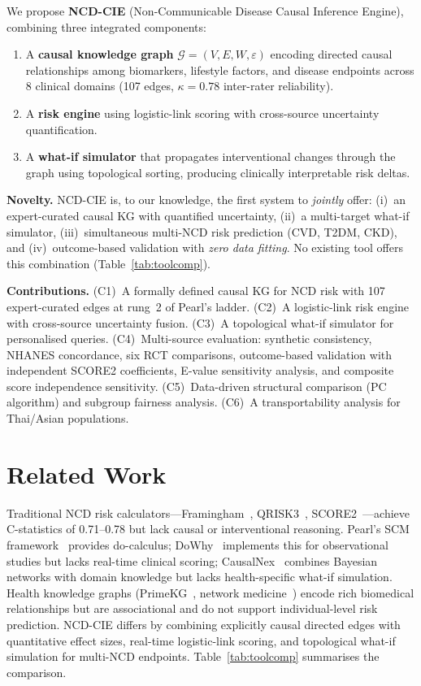 \documentclass[runningheads]{llncs}
\begin{document}
We propose \textbf{NCD-CIE} (Non-Communicable Disease Causal Inference
Engine), combining three integrated components:
\begin{enumerate}
\item A \textbf{causal knowledge graph} $\mathcal{G}=(V,E,W,\varepsilon)$
  encoding directed causal relationships among biomarkers, lifestyle
  factors, and disease endpoints across 8 clinical domains
  (107 edges, $\kappa=0.78$ inter-rater reliability).
\item A \textbf{risk engine} using logistic-link scoring with
  cross-source uncertainty quantification.
\item A \textbf{what-if simulator} that propagates
  interventional changes through the graph using topological sorting,
  producing clinically interpretable risk deltas.
\end{enumerate}

\noindent\textbf{Novelty.}
NCD-CIE is, to our knowledge, the first system to \emph{jointly}
offer: (i)~an expert-curated causal KG with quantified uncertainty,
(ii)~a multi-target what-if simulator,
(iii)~simultaneous multi-NCD risk prediction (CVD, T2DM, CKD), and
(iv)~outcome-based validation with \emph{zero data fitting}.
No existing tool offers this combination (Table~\ref{tab:toolcomp}).

\noindent\textbf{Contributions.}
(C1)~A formally defined causal KG for NCD risk with 107
expert-curated edges at rung~2 of Pearl's ladder.
(C2)~A logistic-link risk engine with cross-source uncertainty fusion.
(C3)~A topological what-if simulator for personalised queries.
(C4)~Multi-source evaluation: synthetic consistency, NHANES
concordance, six RCT comparisons, outcome-based validation
with independent SCORE2 coefficients, E-value sensitivity analysis,
and composite score independence sensitivity.
(C5)~Data-driven structural comparison (PC algorithm) and
subgroup fairness analysis.
(C6)~A transportability analysis for Thai/Asian populations.

\section{Related Work}\label{sec:related}

Traditional NCD risk calculators---Framingham~\cite{dagostino2008},
QRISK3~\cite{hippisley2017qrisk3}, SCORE2~\cite{score22021}---achieve
C-statistics of 0.71--0.78 but lack causal or interventional reasoning.
Pearl's SCM framework~\cite{pearl2009causality} provides do-calculus;
DoWhy~\cite{sharma2020dowhy} implements this for observational studies
but lacks real-time clinical scoring;
CausalNex~\cite{beaumont2021causalnex} combines Bayesian networks
with domain knowledge but lacks health-specific what-if simulation.
Health knowledge graphs (PrimeKG~\cite{chandak2023primekg},
network medicine~\cite{barabasi2011network}) encode rich biomedical
relationships but are associational and do not support
individual-level risk prediction.
NCD-CIE differs by combining explicitly causal directed edges
with quantitative effect sizes, real-time logistic-link scoring,
and topological what-if simulation for multi-NCD endpoints.
Table~\ref{tab:toolcomp} summarises the comparison.
\end{document}
